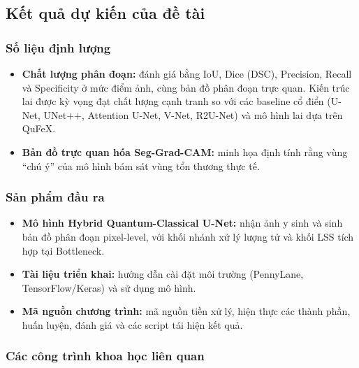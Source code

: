 \documentclass[14pt]{article}  %
\begin{document}
{    \subsection{Kết quả dự kiến của đề tài}

    \subsubsection{Số liệu định lượng}

    \begin{itemize}
        \item \textbf{Chất lượng phân đoạn:} đánh giá bằng IoU, Dice (DSC), Precision, Recall và Specificity ở mức điểm ảnh, cùng bản đồ phân đoạn trực quan. Kiến trúc lai được kỳ vọng đạt chất lượng cạnh tranh so với các baseline cổ điển (U-Net, UNet++, Attention U-Net, V-Net, R2U-Net) và mô hình lai dựa trên QuFeX.

        \item \textbf{Bản đồ trực quan hóa Seg-Grad-CAM:} minh họa định tính rằng vùng ``chú ý'' của mô hình bám sát vùng tổn thương thực tế.

    \end{itemize}

    \subsubsection{Sản phẩm đầu ra}

    \begin{itemize}
        \item \textbf{Mô hình Hybrid Quantum-Classical U-Net:} nhận ảnh y sinh và sinh bản đồ phân đoạn pixel-level, với khối nhánh xử lý lượng tử và khối LSS tích hợp tại Bottleneck.

        \item \textbf{Tài liệu triển khai:} hướng dẫn cài đặt môi trường (PennyLane, TensorFlow/Keras) và sử dụng mô hình.

        \item \textbf{Mã nguồn chương trình:} mã nguồn tiền xử lý, hiện thực các thành phần, huấn luyện, đánh giá và các script tái hiện kết quả.

    \end{itemize}

    \subsubsection{Các công trình khoa học liên quan}

}
\end{document}
